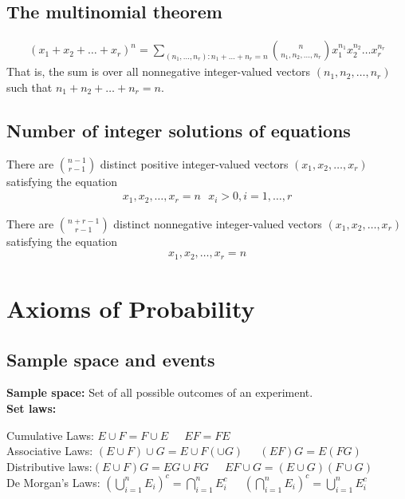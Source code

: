 \documentclass[a4paper]{article}
\begin{document}
\subsection{The multinomial theorem} %
\label{sub:The multinomial theorem}
\begin{align}
  (x_1+x_2+\dots + x_r)^n = \sum_{(n_1,\dots,n_r):n_1+\dots+n_r=n} { n \choose n_1,n_2,\dots, n_r}x_1^{n_1}x_2^{n_2}\dots x_r^{n_r}
\end{align}
That is, the sum is over all nonnegative integer-valued vectors $(n_1,n_2,\dots, n_r)$ such that $n_1+n_2+\dots+n_r = n$.
\subsection{Number of integer solutions of equations} %
\label{sub:Number of integer solutions of equations}
There are ${ n-1 \choose r-1 }$ distinct positive integer-valued vectors $(x_1,x_2,\dots, x_r)$ satisfying the equation
\begin{align}
  x_1,x_2,\dots, x_r = n \text{    } x_i > 0, i=1,\dots, r
\end{align}

There are ${ n+r-1 \choose r-1 }$ distinct nonnegative integer-valued vectors $(x_1,x_2,\dots, x_r)$ satisfying the equation
\begin{align}
  x_1,x_2,\dots, x_r = n 
\end{align}

\section{Axioms of Probability} %
\label{sec:Axioms of Probablity}
\subsection{Sample space and events} %
\label{sub:Sample space and events}
{\bf Sample space:} Set of all possible outcomes of an experiment. \\
{\bf Set laws:}
\begin{center}
  Cumulative Laws: $E \cup F = F \cup E   \;\;\;\;$          $EF = FE$ \\
  Associative Laws: $(E \cup F)\cup G= E \cup F(\cup G) \;\;\;\;$        $(EF)G=E(FG)$ \\
  Distributive laws:$(E \cup F) G = EG \cup FG\;\;\;\;$     $EF\cup G = (E\cup G)(F \cup G)$ \\
  De Morgan's Laws: $(\bigcup_{i=1}^n E_i )^c = \bigcap_{i=1}^n E_i^c \;\;\;\;$     $(\bigcap_{i=1}^n E_i )^c = \bigcup_{i=1}^n E_i^c$
\end{center}
\end{document}
